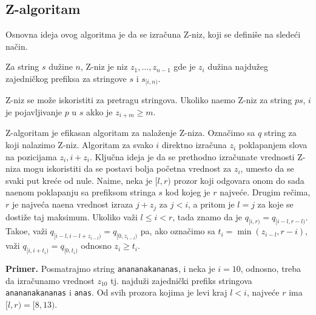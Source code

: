 \noindent
\begin{minipage}[l]{\textwidth}

\end{minipage}

\subsection{Z-algoritam}

Osnovna ideja ovog algoritma je da se izra\v cuna Z-niz, koji se defini\v se na slede\' ci na\v cin.

\begin{dfn}
Za string $s$ du\v zine $n$, Z-niz je niz $z_1, \ldots, z_{n-1}$ gde je $z_i$ du\v zina najdu\v zeg zajedni\v ckog prefiksa za stringove $s$ i $s_{[i, n)}$.
\end{dfn}

Z-niz se mo\v ze iskoristiti za pretragu stringova. Ukoliko na\dj emo Z-niz za string $ps$, $i$ je pojavljivanje $p$ u $s$ akko je $z_{i+m} \geq m$.

Z-algoritam je efikasan algoritam za nala\v zenje Z-niza.\cite{zalgoknjiga} Ozna\v cimo sa $q$ string za koji nalazimo Z-niz. Algoritam za svako $i$ direktno izra\v cuna $z_i$ poklapanjem slova na pozicijama $z_i, i + z_i$. Klju\v cna ideja je da se prethodno izra\v cunate vrednosti Z-niza mogu iskoristiti da se postavi bolja po\v cetna vrednost za $z_i$, umesto da se svaki put kre\' ce od nule. Naime, neka je $[l,r)$ prozor koji odgovara onom do sada na\dj enom poklapanju sa prefiksom stringa $s$ kod kojeg je $r$ najve\' ce. Drugim re\v cima, $r$ je najve\' ca na\dj ena vrednost izraza $j+z_j$ za $j<i$, a pritom je $l = j$ za koje se dosti\v ze taj maksimum. Ukoliko va\v zi $l \leq i < r$, tada znamo da je $q_{[i, r)} = q_{[i-l, r-l)}$. Tako\dj e, va\v zi $q_{[i-l, i-l+z_{i-l})} = q_{[0, z_{i-l})}$ pa, ako ozna\v cimo sa $t_i = \min(z_{i-l}, r-i)$, va\v zi $q_{[i, i+t_i)} = q_{[0, t_i)}$ odnosno $z_i \geq t_i$.

\noindent
\begin{minipage}[l]{\textwidth}

\end{minipage}

\noindent \textbf{Primer.} Posmatrajmo string \texttt{anananakananas}, i neka je $i=10$, odnosno, treba da izra\v cunamo vrednost $z_{10}$ tj. najdu\v zi zajedni\v cki prefiks stringova \texttt{anananakananas} i \texttt{anas}. Od svih prozora kojima je levi kraj $l < i$, najve\' ce $r$ ima $[l,r) = [8,13)$.


